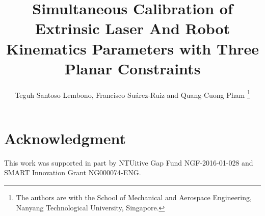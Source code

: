 \documentclass[letterpaper, 10 pt, conference]{ieeeconf}
\title{\LARGE
  \textbf{Simultaneous Calibration of Extrinsic Laser And Robot Kinematics Parameters with Three Planar Constraints}}
\author{Teguh Santoso Lembono, Francisco Su\'{a}rez-Ruiz and Quang-Cuong Pham%
  \thanks{The authors are with the School of Mechanical and Aerospace
          Engineering, Nanyang Technological University, Singapore.}}
\begin{document}
\maketitle
\thispagestyle{empty}
\pagestyle{empty}








\section*{Acknowledgment}
This work was supported in part by NTUitive Gap Fund NGF-2016-01-028
and SMART Innovation Grant NG000074-ENG.




\end{document}
